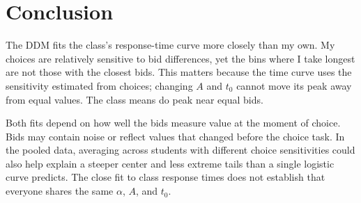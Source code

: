 \section{Conclusion}
\label{sec:conclusion}

The DDM fits the class's response-time curve more closely than my own.
My choices are relatively sensitive to bid differences, yet the bins where
I take longest are not those with the closest bids. This matters because
the time curve uses the sensitivity estimated from choices; changing $A$
and $t_0$ cannot move its peak away from equal values. The class means do
peak near equal bids.

Both fits depend on how well the bids measure value at the moment of choice.
Bids may contain noise or reflect values that changed before the choice
task. In the pooled data, averaging across students with different choice
sensitivities could also help explain a steeper center and less extreme
tails than a single logistic curve predicts. The close fit to class
response times does not establish that everyone shares the same
$\alpha$, $A$, and $t_0$.
